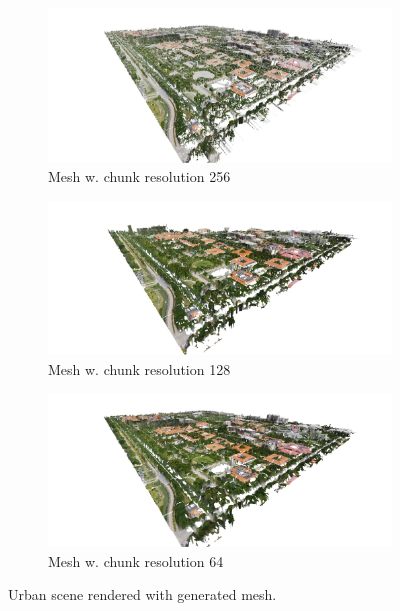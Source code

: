 \begin{figure}[h]
    \centering
    
    \begin{subfigure}{0.9\textwidth}
        \centering
        \includegraphics[width=\textwidth]{figs/results/mesh-urban-256.jpg}
        \caption{Mesh w. chunk resolution 256}
    \end{subfigure}
    
    \begin{subfigure}{0.9\textwidth}
        \centering
        \includegraphics[width=\textwidth]{figs/results/mesh-urban-128.jpg}
        \caption{Mesh w. chunk resolution 128}
    \end{subfigure}
    
    \begin{subfigure}{0.9\textwidth}
        \centering
        \includegraphics[width=\textwidth]{figs/results/mesh-urban-64.jpg}
        \caption{Mesh w. chunk resolution 64}
    \end{subfigure}
    
    \caption{Urban scene rendered with generated mesh.}
\end{figure}


